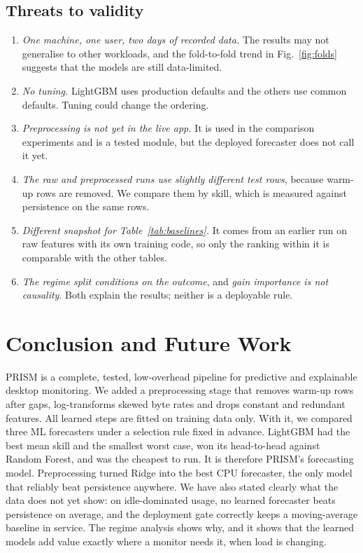 \documentclass[conference]{IEEEtran}
\begin{document}
\subsection{Threats to validity}
\begin{enumerate}
  \item \emph{One machine, one user, two days of recorded data.} The results
        may not generalise to other workloads, and the fold-to-fold trend in
        Fig.~\ref{fig:folds} suggests that the models are still data-limited.
  \item \emph{No tuning.} LightGBM uses production defaults and the others
        use common defaults. Tuning could change the ordering.
  \item \emph{Preprocessing is not yet in the live app.} It is used in the
        comparison experiments and is a tested module, but the deployed
        forecaster does not call it yet.
  \item \emph{The raw and preprocessed runs use slightly different test
        rows}, because warm-up rows are removed. We compare them by skill,
        which is measured against persistence on the same rows.
  \item \emph{Different snapshot for Table~\ref{tab:baselines}.} It comes
        from an earlier run on raw features with its own training code, so
        only the ranking within it is comparable with the other tables.
  \item \emph{The regime split conditions on the outcome}, and \emph{gain
        importance is not causality}. Both explain the results; neither is a
        deployable rule.
\end{enumerate}

\section{Conclusion and Future Work}
PRISM is a complete, tested, low-overhead pipeline for predictive and
explainable desktop monitoring. We added a preprocessing stage that removes
warm-up rows after gaps, log-transforms skewed byte rates and drops constant
and redundant features. All learned steps are fitted on training data only.
With it, we compared three ML forecasters under a selection rule fixed in
advance. LightGBM had the best mean skill and the smallest worst case, won its
head-to-head against Random Forest, and was the cheapest to run. It is
therefore PRISM's forecasting model. Preprocessing turned Ridge into the best
CPU forecaster, the only model that reliably beat persistence anywhere. We have
also stated clearly what the data does not yet show: on idle-dominated usage,
no learned forecaster beats persistence on average, and the deployment gate
correctly keeps a moving-average baseline in service. The regime analysis
shows why, and it shows that the learned models add value exactly where a
monitor needs it, when load is changing.
\end{document}
